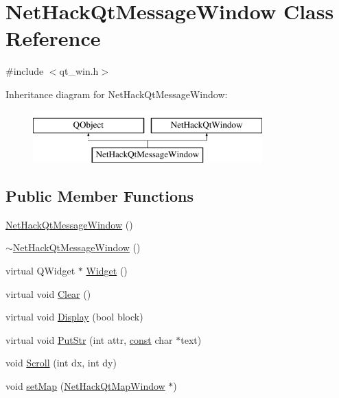 \hypertarget{classNetHackQtMessageWindow}{\section{Net\+Hack\+Qt\+Message\+Window Class Reference}
\label{classNetHackQtMessageWindow}
}


{\ttfamily \#include $<$qt\+\_\+win.\+h$>$}

Inheritance diagram for Net\+Hack\+Qt\+Message\+Window\+:\begin{figure}[H]
\begin{center}
\leavevmode
\includegraphics[height=2.000000cm]{classNetHackQtMessageWindow}
\end{center}
\end{figure}
\subsection*{Public Member Functions}
\begin{DoxyCompactItemize}
\item 
\hyperlink{classNetHackQtMessageWindow_a7473b2d2c74e87c8fc20638277ab9d9b}{Net\+Hack\+Qt\+Message\+Window} ()
\item 
\hyperlink{classNetHackQtMessageWindow_af91845afa7cfb3713571096bb9c002f6}{$\sim$\+Net\+Hack\+Qt\+Message\+Window} ()
\item 
virtual Q\+Widget $\ast$ \hyperlink{classNetHackQtMessageWindow_a752b88fd898eab4cdc041eb5c1ab0ff0}{Widget} ()
\item 
virtual void \hyperlink{classNetHackQtMessageWindow_a2c3256725a18b0da3b8f76707c0b6594}{Clear} ()
\item 
virtual void \hyperlink{classNetHackQtMessageWindow_a9d9b7f0d013b5db6b1b22d6b5f91c3b0}{Display} (bool block)
\item 
virtual void \hyperlink{classNetHackQtMessageWindow_ab31577b8b36ea1c91175b1dde1182389}{Put\+Str} (int attr, \hyperlink{tradstdc_8h_a2c212835823e3c54a8ab6d95c652660e}{const} char $\ast$text)
\item 
void \hyperlink{classNetHackQtMessageWindow_a9d47c4912a48e3ed3016553b61e3156b}{Scroll} (int dx, int dy)
\item 
void \hyperlink{classNetHackQtMessageWindow_aaf0d7a04dedb6703ef08cd0742d24d35}{set\+Map} (\hyperlink{classNetHackQtMapWindow}{Net\+Hack\+Qt\+Map\+Window} $\ast$)
\end{DoxyCompactItemize}
